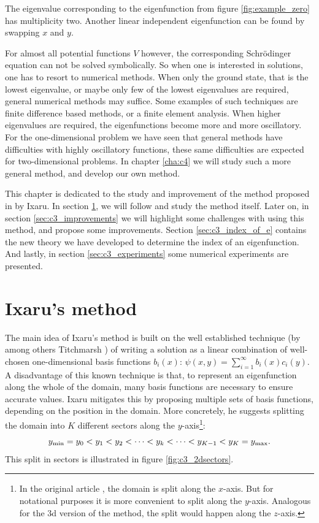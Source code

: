 The eigenvalue corresponding to the eigenfunction from figure \ref{fig:example_zero} has multiplicity two. Another linear independent eigenfunction can be found by swapping $x$ and $y$.

For almost all potential functions $V$ however, the corresponding Schrödinger equation can not be solved symbolically. So when one is interested in solutions, one has to resort to numerical methods. When only the ground state, that is the lowest eigenvalue, or maybe only few of the lowest eigenvalues are required, general numerical methods may suffice. Some examples of such techniques are finite difference based methods, or a finite element analysis. When higher eigenvalues are required, the eigenfunctions become more and more oscillatory. For the one-dimensional problem we have seen that general methods have difficulties with highly oscillatory functions, these same difficulties are expected for two-dimensional problems. In chapter \ref{cha:c4} we will study such a more general method, and develop our own method.

This chapter is dedicated to the study and improvement of the method proposed in \cite{ixaru_new_2010} by Ixaru. In section \ref{sec:c3_ixarus_method}, we will follow \cite{ixaru_new_2010} and study the method itself. Later on, in section \ref{sec:c3_improvements} we will highlight some challenges with using this method, and propose some improvements. Section \ref{sec:c3_index_of_e} contains the new theory we have developed to determine the index of an eigenfunction. And lastly, in section \ref{sec:c3_experiments} some numerical experiments are presented.

\section{Ixaru's method}\label{sec:c3_ixarus_method}

The main idea of Ixaru's method is built on the well established technique (by among others Titchmarsh \cite{titchmarsh_eigenfunction_1962}) of writing a solution as a linear combination of well-chosen one-dimensional basis functions $b_i(x)$: $\psi(x, y) = \sum_{i=1}^\infty b_i(x) c_i(y)$. A disadvantage of this known technique is that, to represent an eigenfunction along the whole of the domain, many basis functions are necessary to ensure accurate values. Ixaru mitigates this by proposing multiple sets of basis functions, depending on the position in the domain. More concretely, he suggests splitting the domain into $K$ different sectors along the $y$-axis\footnote{In the original article \cite{ixaru_new_2010}, the domain is split along the $x$-axis. But for notational purposes it is more convenient to split along the $y$-axis. Analogous for the 3d version of the method, the split would happen along the $z$-axis.}:
$$
  {y_{\text{min}}} = y_0 < y_1 < y_2 < \dots < y_k < \dots < y_{K-1} < y_{K} = {y_{\text{max}}}\text{.}
$$
This split in sectors is illustrated in figure \ref{fig:c3_2dsectors}.

